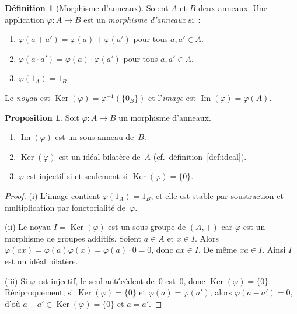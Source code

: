 \documentclass[12pt,a4paper,openany]{book}
\theoremstyle{definition}
\newtheorem{definition}{Définition}[chapter]
\newtheorem{proposition}{Proposition}[chapter]
\DeclareMathOperator{\Ker}{Ker}
\renewcommand{\Im}{\operatorname{Im}}
\begin{document}
\begin{definition}[Morphisme d'anneaux]\label{def:morphisme-anneaux}
Soient $A$ et $B$ deux anneaux. Une application $\varphi \colon A \to B$
est un \emph{morphisme d'anneaux} si~:
\begin{enumerate}[label=\textup{(\roman*)}]
  \item $\varphi(a + a') = \varphi(a) + \varphi(a')$ pour tous
        $a, a' \in A$.
  \item $\varphi(a \cdot a') = \varphi(a) \cdot \varphi(a')$ pour tous
        $a, a' \in A$.
  \item $\varphi(1_A) = 1_B$.
\end{enumerate}
Le \emph{noyau} est
$\Ker(\varphi) = \varphi^{-1}(\{0_B\})$ et l'\emph{image}
est $\Im(\varphi) = \varphi(A)$.
\end{definition}

\begin{proposition}\label{prop:noyau-ideal}
Soit $\varphi \colon A \to B$ un morphisme d'anneaux.
\begin{enumerate}[label=\textup{(\roman*)}]
  \item $\Im(\varphi)$ est un sous-anneau de~$B$.
  \item $\Ker(\varphi)$ est un idéal bilatère de~$A$
        (cf.\ définition~\ref{def:ideal}).
  \item $\varphi$ est injectif si et seulement si
        $\Ker(\varphi) = \{0\}$.
\end{enumerate}
\end{proposition}

\begin{proof}
(i) L'image contient $\varphi(1_A) = 1_B$, et elle est stable par
soustraction et multiplication par fonctorialité de~$\varphi$.

(ii) Le noyau $I = \Ker(\varphi)$ est un sous-groupe de $(A,+)$ car
$\varphi$ est un morphisme de groupes additifs. Soient $a \in A$ et
$x \in I$. Alors $\varphi(ax) = \varphi(a)\varphi(x) = \varphi(a) \cdot 0 = 0$,
donc $ax \in I$. De même $xa \in I$. Ainsi $I$ est un idéal bilatère.

(iii) Si $\varphi$ est injectif, le seul antécédent de~$0$ est~$0$, donc
$\Ker(\varphi) = \{0\}$. Réciproquement, si $\Ker(\varphi) = \{0\}$
et $\varphi(a) = \varphi(a')$, alors $\varphi(a - a') = 0$, d'où
$a - a' \in \Ker(\varphi) = \{0\}$ et $a = a'$.
\end{proof}
\end{document}
